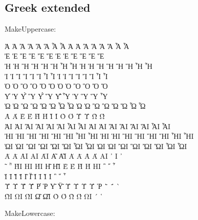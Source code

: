 \documentclass[a4paper]{article}
\begin{document}
{\subsection{Greek extended}

MakeUppercase:


\MakeUppercase{ ἀ ἁ ἂ ἃ ἄ ἅ ἆ ἇ Ἀ Ἁ Ἂ Ἃ Ἄ Ἅ Ἆ Ἇ }\\
\MakeUppercase{ ἐ ἑ ἒ ἓ ἔ ἕ     Ἐ Ἑ Ἒ Ἓ Ἔ Ἕ     }\\
\MakeUppercase{ ἠ ἡ ἢ ἣ ἤ ἥ ἦ ἧ Ἠ Ἡ Ἢ Ἣ Ἤ Ἥ Ἦ Ἧ }\\
\MakeUppercase{ ἰ ἱ ἲ ἳ ἴ ἵ ἶ ἷ Ἰ Ἱ Ἲ Ἳ Ἴ Ἵ Ἶ Ἷ }\\
\MakeUppercase{ ὀ ὁ ὂ ὃ ὄ ὅ     Ὀ Ὁ Ὂ Ὃ Ὄ Ὅ     }\\
\MakeUppercase{ ὐ ὑ ὒ ὓ ὔ ὕ ὖ ὗ   Ὑ   Ὓ   Ὕ   Ὗ }\\
\MakeUppercase{ ὠ ὡ ὢ ὣ ὤ ὥ ὦ ὧ Ὠ Ὡ Ὢ Ὣ Ὤ Ὥ Ὦ Ὧ }\\
\MakeUppercase{ ὰ ά ὲ έ ὴ ή ὶ ί ὸ ό ὺ ύ ὼ ώ     }\\
\MakeUppercase{ ᾀ ᾁ ᾂ ᾃ ᾄ ᾅ ᾆ ᾇ ᾈ ᾉ ᾊ ᾋ ᾌ ᾍ ᾎ ᾏ }\\
\MakeUppercase{ ᾐ ᾑ ᾒ ᾓ ᾔ ᾕ ᾖ ᾗ ᾘ ᾙ ᾚ ᾛ ᾜ ᾝ ᾞ ᾟ }\\
\MakeUppercase{ ᾠ ᾡ ᾢ ᾣ ᾤ ᾥ ᾦ ᾧ ᾨ ᾩ ᾪ ᾫ ᾬ ᾭ ᾮ ᾯ }\\
\MakeUppercase{ ᾰ ᾱ ᾲ ᾳ ᾴ   ᾶ ᾷ Ᾰ Ᾱ Ὰ Ά ᾼ ᾽ ι ᾿ }\\
\MakeUppercase{ ῀ ῁ ῂ ῃ ῄ   ῆ ῇ Ὲ Έ Ὴ Ή ῌ ῍ ῎ ῏ }\\
\MakeUppercase{ ῐ ῑ ῒ ΐ     ῖ ῗ Ῐ Ῑ Ὶ Ί   ῝ ῞ ῟ }\\
\MakeUppercase{ ῠ ῡ ῢ ΰ ῤ ῥ ῦ ῧ Ῠ Ῡ Ὺ Ύ Ῥ ῭ ΅ ` }\\
\MakeUppercase{     ῲ ῳ ῴ   ῶ ῷ Ὸ Ό Ὼ Ώ ῼ ´ ῾   }

MakeLowercase:

}
\end{document}
